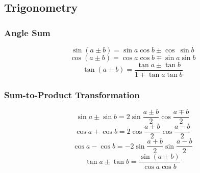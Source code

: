 \subsection{Trigonometry}

\subsubsection{Angle Sum}

$$ \sin(a \pm b) = \sin a \cos b \pm \cos \ \sin b $$
$$ \cos(a \pm b) = \cos a \cos b \mp \sin a \sin b $$
$$ \tan (a \pm b) = \frac{\tan a \pm \tan b}{1 \mp \tan a \tan b}$$

\subsubsection{Sum-to-Product Transformation}

$$ \sin a \pm \sin b = 2 \sin\frac{a \pm b}{2} \cos\frac{a \mp b}{2} $$
$$ \cos a + \cos b = 2 \cos\frac{a+b}{2} \cos\frac{a-b}{2} $$
$$ \cos a - \cos b = -2 \sin\frac{a+b}{2} \sin\frac{a-b}{2} $$
$$ \tan a \pm \tan b = \frac{\sin(a \pm b)}{\cos a \cos b} $$
